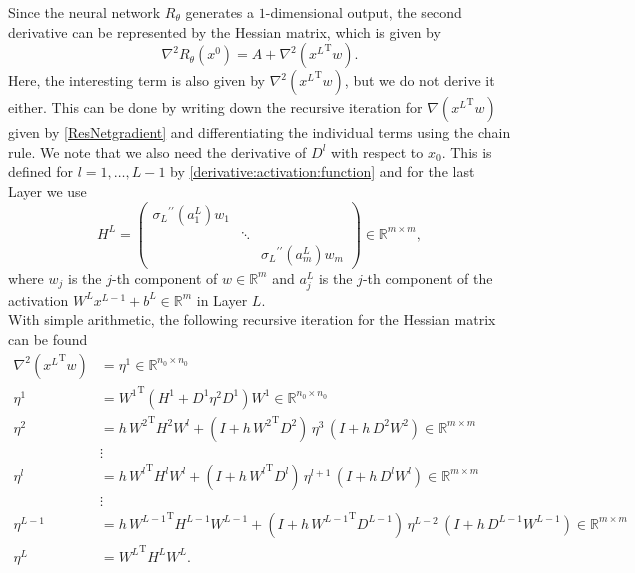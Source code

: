 Since the neural network $R_{\theta}$ generates a $1$-dimensional output, the second derivative can be represented by the Hessian matrix, which is given by 
\begin{equation}
    \label{ResNetHessiancomplete}
    \nabla^2 R_{\theta} \left( x^0 \right) = A + \nabla^2 \left( {x^{L}}^{\mathrm{T}} w \right). 
\end{equation}
Here, the interesting term is also given by $\nabla^2 \left( {x^{L}}^{\mathrm{T}} w \right)$, but we do not derive it either. This can be done by writing down the recursive iteration for $\nabla \left( {x^{L}}^{\mathrm{T}} w \right)$ given by \cref{ResNetgradient} and differentiating the individual terms using the chain rule. We note that we also need the derivative of $D^l$ with respect to $x_0$. This is defined for $l = 1, \ldots, L-1$ by \cref{derivative:activation:function} and for the last Layer we use 
\begin{equation}
    \label{ResNet first hessian}
    H^{L} = \begin{pmatrix} {\sigma_{L}}^{\prime \prime} \left( a^{L}_1 \right) w_1 & & \\ & \ddots & \\ & & {\sigma_{L}}^{\prime \prime} \left( a^{L}_{m} \right) w_{m} \end{pmatrix} \in \mathbb{R}^{m \times m},
\end{equation}
where $w_{j}$ is the $j$-th component of $w \in \mathbb{R}^m$ and $a^{L}_j$ is the $j$-th component of the activation $W^L x^{L-1} + b^L \in \mathbb{R}^m$ in Layer $L$. \\
With simple arithmetic, the following recursive iteration for the Hessian matrix can be found
\begin{equation}
    \label{Hessian recursion resnet}
    \begin{aligned}
        \nabla^2 \left( {x^{L}}^{\mathrm{T}} w \right) & = \eta^{1} \in \mathbb{R}^{n_0 \times n_0}  \\
        \eta^{1} & = {W^{1}}^{\mathrm{T}} \left( H^{1} + D^{1} \eta^{2} D^{1} \right) W^{1} \in \mathbb{R}^{n_0 \times n_0} \\
        \eta^{2} & = h \, {W^{2}}^{\mathrm{T}} H^2 W^{l} + \left( I + h \, {W^{2}}^{\mathrm{T}} D^{2} \right) \, \eta^{3} \, \left( I + h \,  D^{2} W^{2} \right) \in \mathbb{R}^{m \times m}\\ 
        &\vdots\\
        \eta^{l} & = h \, {W^{l}}^{\mathrm{T}} H^{l} W^{l} + \left( I + h \, {W^{l}}^{\mathrm{T}} D^{l} \right) \, \eta^{l+1} \, \left( I + h \,  D^{l} {W^{l}} \right) \in \mathbb{R}^{m \times m} \\ 
        &\vdots\\
        \eta^{L-1} & = h \, {W^{L-1}}^{\mathrm{T}} H^{L-1} W^{L-1} + \left( I + h \, {W^{L-1}}^{\mathrm{T}} D^{L-1} \right) \, \eta^{L-2} \, \left( I + h \,  D^{L-1} W^{L-1} \right) \in \mathbb{R}^{m \times m} \\ 
        \eta^{L} &  = {W^{L}}^{\mathrm{T}} H^{L} W^{L}.
    \end{aligned}
\end{equation}

